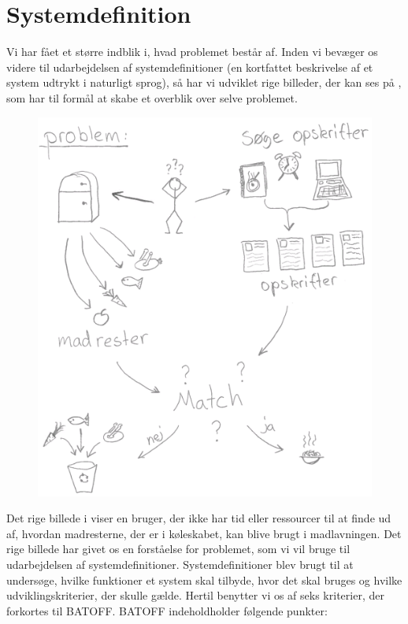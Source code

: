 \section{Systemdefinition}
\label{sec:systemdefinition}

Vi har fået et større indblik i, hvad problemet består af. Inden vi bevæger os videre til udarbejdelsen af systemdefinitioner (en kortfattet beskrivelse af et system udtrykt i naturligt sprog), så har vi udviklet rige billeder, der kan ses på , som har til formål at skabe et overblik over selve problemet. 

\begin{figure}
\centering
\includegraphics[scale=0.6]{billeder/rigebilleder/problemomraade.png}
\label{fig:rigbillede1}
\end{figure}

Det rige billede i  viser en bruger, der ikke har tid eller ressourcer til at finde ud af, hvordan madresterne, der er i køleskabet, kan blive brugt i madlavningen. Det rige billede har givet os en forståelse for problemet, som vi vil bruge til udarbejdelsen af systemdefinitioner. Systemdefinitioner blev brugt til at undersøge, hvilke funktioner et system skal tilbyde, hvor det skal bruges og hvilke udviklingskriterier, der skulle gælde. Hertil benytter vi os af seks kriterier, der forkortes til BATOFF. \cite[s.~37]{ooad} BATOFF indeholdholder følgende punkter: 

